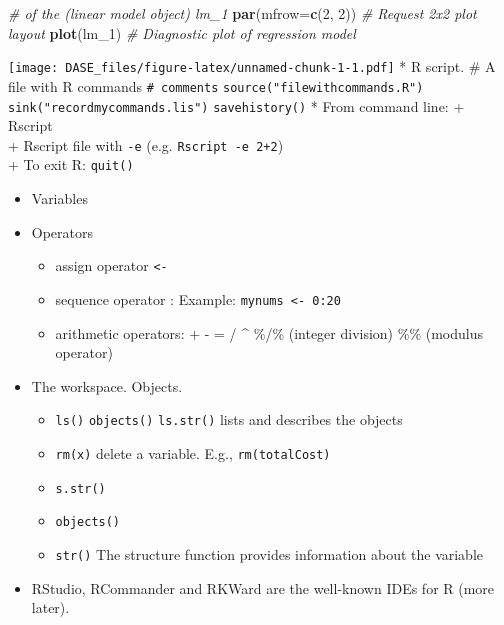 \documentclass[]{book}
\newenvironment{Shaded}{\begin{snugshade}}{\end{snugshade}}
\newcommand{\KeywordTok}[1]{\textcolor[rgb]{0.13,0.29,0.53}{\textbf{{#1}}}}
\newcommand{\DataTypeTok}[1]{\textcolor[rgb]{0.13,0.29,0.53}{{#1}}}
\newcommand{\DecValTok}[1]{\textcolor[rgb]{0.00,0.00,0.81}{{#1}}}
\newcommand{\CommentTok}[1]{\textcolor[rgb]{0.56,0.35,0.01}{\textit{{#1}}}}
\newcommand{\NormalTok}[1]{{#1}}
\providecommand{\tightlist}{%
  \setlength{\itemsep}{0pt}\setlength{\parskip}{0pt}}
\begin{document}
\begin{Shaded}
\begin{Highlighting}[]
                      \CommentTok{# of the (linear model object) lm_1}
\KeywordTok{par}\NormalTok{(}\DataTypeTok{mfrow=}\KeywordTok{c}\NormalTok{(}\DecValTok{2}\NormalTok{, }\DecValTok{2}\NormalTok{))    }\CommentTok{# Request 2x2 plot layout}
\KeywordTok{plot}\NormalTok{(lm_1)            }\CommentTok{# Diagnostic plot of regression model}
\end{Highlighting}
\end{Shaded}

\texttt{[image: DASE\_files/figure-latex/unnamed-chunk-1-1.pdf]} * R
script. \# A file with R commands \texttt{\#\ comments}
\texttt{source("filewithcommands.R")}
\texttt{sink("recordmycommands.lis")} \texttt{savehistory()} * From
command line: + Rscript\\
+ Rscript file with \texttt{-e} (e.g. \texttt{Rscript\ -e\ 2+2})\\
+ To exit R: \texttt{quit()}

\begin{itemize}
\tightlist
\item
  Variables
\item
  Operators

  \begin{itemize}
  \tightlist
  \item
    assign operator \texttt{\textless{}-}\\
  \item
    sequence operator : Example: \texttt{mynums\ \textless{}-\ 0:20}
  \item
    arithmetic operators: + - = / \^{} \%/\% (integer division) \%\%
    (modulus operator)
  \end{itemize}
\item
  The workspace. Objects.

  \begin{itemize}
  \tightlist
  \item
    \texttt{ls()} \texttt{objects()} \texttt{ls.str()} lists and
    describes the objects\\
  \item
    \texttt{rm(x)} delete a variable. E.g., \texttt{rm(totalCost)}
  \item
    \texttt{s.str()}
  \item
    \texttt{objects()}
  \item
    \texttt{str()} The structure function provides information about the
    variable
  \end{itemize}
\item
  RStudio, RCommander and RKWard are the well-known IDEs for R (more
  later).
\end{itemize}
\end{document}
